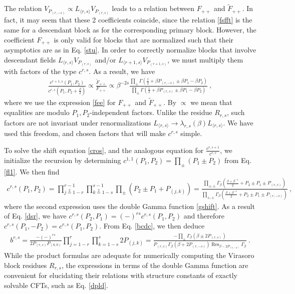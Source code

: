 \documentclass[12pt, a4paper]{article}
\begin{document}
The relation $V_{P_{(r,-s)}}\propto L_{\langle r,s\rangle}V_{P_{(r,s)}}$ leads to a relation between $F_{++}$ and $\widetilde{F}_{++}$. In fact, it may seem that these 2 coefficients coincide, since the relation \eqref{fsfft} is the same for a descendant block as for the corresponding primary block. However, the coefficient $F_{++}$ is only valid for blocks that are normalized such that their asymptotics are as in Eq. \eqref{stu}. In order to correctly normalize blocks that involve descendant fields $L_{\langle r,s\rangle}V_{P_{(r,s)}}$ and/or $L_{\langle r+1,s\rangle}V_{P_{(r+1,s)}}$, we must multiply them with factors of the type $c^{r,s}$. As a result, we have 
\begin{align}
 \frac{c^{r+1,s}(P_1,P_2)}{c^{r,s}(P_1,P_2+\frac{\beta}{2})} \propto \frac{\widetilde{F}_{++}}{F_{++}} \propto \beta^{-2s}\frac{\prod_{\pm} \Gamma(\frac12+\beta P_{(r,-s)} \pm \beta P_1 -\beta P_2)}{\prod_{\pm} \Gamma(\frac12+\beta P_{(r,s)} \pm \beta P_1 -\beta P_2)} \ , 
 \label{cros}
\end{align}
where we use the expression \eqref{fee} for $F_{++}$ and $\widetilde{F}_{++}$. By $\propto$ we mean that equalities are modulo $P_1,P_2$-independent factors. Unlike the residue $R_{r,s}$, such factors are not invariant under renormalizations $L_{\langle r,s\rangle} \to \lambda_{r,s}(\beta)L_{\langle r,s\rangle}$. We have used this freedom, and chosen factors that will make $c^{r,s}$ simple. 

To solve the shift equation \eqref{cros}, and the analogous equation for $\frac{c^{r,s+1}}{c ^{r,s}}$, we initialize the recursion by determining $c^{1,1}(P_1,P_2) =\prod_\pm (P_1\pm P_2) $ from Eq. \eqref{fl1}. We then find 
\begin{align}
 \boxed{c^{r,s}(P_1,P_2) = \prod_{j\overset{2}{=}1-r}^{r-1} \prod_{k\overset{2}{=}1-s}^{s-1} \prod_\pm \left(P_2\pm P_1+ P_{(j,k)}\right) = \frac{\prod_{\pm,\pm}\Gamma_\beta\left(\frac{\beta+\beta^{-1}}{2} +P_2\pm P_1 \pm P_{(r,s)}\right)}
 {\prod_{\pm,\pm}\Gamma_\beta\left(\frac{\beta+\beta^{-1}}{2} +P_2\pm P_1 \pm P_{(r,-s)}\right)}}\ , 
 \label{crs}
\end{align}
where the second expression uses the double Gamma function \eqref{gshift}. As a result of Eq. \eqref{dsr}, we have $c^{r,s}(P_2,P_1)=(-)^{rs} c^{r,s}(P_1,P_2)$ and therefore $c^{r,s}(P_1,-P_2)=c^{r,s}(P_1,P_2)$. From Eq. \eqref{bcdc}, we then deduce 
\begin{align}
 \boxed{b^{r,s} = \frac{-(-)^{rs}}{2P_{(r,s)}P_{(0,0)}} \prod_{j=1-r}^r\prod_{k=1-s}^s 2P_{(j,k)} = 
 \frac{-\prod_\pm \Gamma_\beta\left(\beta \pm 2P_{(r,s)}\right)}{P_{(r,s)}\Gamma_\beta\left(\beta+2P_{(r,-s)}\right)\operatorname{Res}_{\beta-2P_{(r,-s)}}\Gamma_\beta}}\ .
 \label{brs}
\end{align}
While the product formulas are adequate for numerically computing the Virasoro block residues $R_{r,s}$, the expressions in terms of the double Gamma function are convenient for elucidating their relations with structure constants of exactly solvable CFTs, such as Eq. \eqref{dpld}.
\end{document}
